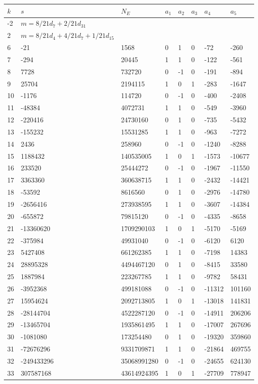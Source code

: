 \documentclass{amsart}
\begin{document}
\begin{longtable}{|l|l|l|lllll|}
\hline
$k$ & $s$ & $N_E$ & $a_1$ & $a_2$ & $a_3$ & $a_4$ & $a_5$\\
\hline
-2&$m=8/21d_{7}+2/21d_{31}$&&\multicolumn{5}{c|}{}\\
2&$m=8/21d_{4}+4/21d_{7}+1/21d_{15}$&&\multicolumn{5}{c|}{}\\
6&-21&1568&0&1&0&-72&-260\\
7&-294&20445&1&1&0&-122&-561\\
8&7728&732720&0&-1&0&-191&-894\\
9&25704&2194115&1&0&1&-283&-1647\\
10&-1176&114720&0&-1&0&-400&-2408\\
11&-48384&4072731&1&1&0&-549&-3960\\
12&-220416&24730160&0&1&0&-735&-5432\\
13&-155232&15531285&1&1&0&-963&-7272\\
14&2436&258960&0&-1&0&-1240&-8288\\
15&1188432&140535005&1&0&1&-1573&-10677\\
16&233520&25444272&0&-1&0&-1967&-11550\\
17&3363360&360638715&1&1&0&-2432&-14421\\
18&-53592&8616560&0&1&0&-2976&-14780\\
19&-2656416&273938595&1&1&0&-3607&-14384\\
20&-655872&79815120&0&-1&0&-4335&-8658\\
21&-13360620&1709290103&1&0&1&-5170&-5169\\
22&-375984&49931040&0&-1&0&-6120&6120\\
23&5427408&661262385&1&1&0&-7198&14383\\
24&28895328&4494467120&0&1&0&-8415&33580\\
25&1887984&223267785&1&1&0&-9782&58431\\
26&-3952368&499181088&0&-1&0&-11312&101160\\
27&15954624&2092713805&1&0&1&-13018&141831\\
28&-28144704&4522287120&0&-1&0&-14911&206206\\
29&-13465704&1935861495&1&1&0&-17007&267696\\
30&-1081080&173254480&0&1&0&-19320&359860\\
31&-72676296&9331709871&1&1&0&-21864&469755\\
32&-249433296&35068991280&0&-1&0&-24655&624130\\
33&307587168&43614924395&1&0&1&-27709&778947\\

\end{longtable}
\end{document}
